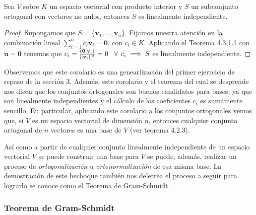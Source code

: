 \documentclass[12pt]{article}
\newenvironment{corolario}[2][Corolario]{\begin{trivlist}
\item[\hskip \labelsep {\bfseries #1}]}{\end{trivlist}}
\begin{document}
\begin{corolario} {4.3.1}
Sea $V$ sobre $K$ un espacio vectorial con producto interior y $S$ un subconjunto ortogonal con vectores no nulos, entonces $S$ es linealmente independiente.

\begin{proof}
    Supongamos que $S=\{\mathbf{v}_1, ..., \mathbf{v}_n\}.$ Fijamos nuestra atención en la combinación lineal $\sum_{i=1}^n c_i\mathbf{v}_i=\mathbf{0}$, con $c_i\in K$. Aplicando el Teorema 4.3.1.1 con $\mathbf{u}=\mathbf{0}$ tenemos que $c_i=\frac{(\mathbf{0},\mathbf{v}_i)}{||\mathbf{v}_i||^2}=0\hspace{3mm}\forall\hspace{1.5mm}  c_i\implies S$ es linealmente independiente.
\end{proof}

Observemos que este corolario es una genearlización del primer ejerrcicio de repaso de la sección 3. Además, este corolario y el teorema del cual se desprende nos dicen que los conjuntos ortogonales son buenos candidatos para bases, ya que son linealmente independientes y el cálculo de los coeficientes $c_i$ es sumamente sencillo. En particular, aplicando este corolario a los conjuntos ortogonales vemos que, si $V$ es un espacio vectorial de dimensión $n$, entonces cualquier conjunto ortogonal de $n$ vectores es una base de $V$ (ver teorema 4.2.3). 
\end{corolario}

Así como a partir de cualquier conjunto linealmente independiente de un espacio vectorial $V$ se puede construir una base para $V$ se puede, además, realizar un proceso de \emph{ortogonalización} u \emph{ortonormalización} de esa misma base. La demostración de este hecho\textemdash que también nos deletrea el proceso a seguir para lograrlo\textemdash \hspace{0.5mm} se conoce como el Teorema de Gram-Schmidt.

\subsubsection{Teorema de Gram-Schmidt} \label{Teo:Gram-Schmidt}
\end{document}
